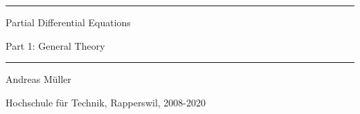\documentclass[a4paper,12pt]{book}
\begin{document}
\pagestyle{fancy}
\lhead{}
\rhead{}
\frontmatter
\newcommand\HRule{\noindent\rule{\linewidth}{1.5pt}}
\begin{titlepage}
\HRule
\vspace*{10pt}
\begin{flushright}
{\Huge
Partial Differential Equations}
\end{flushright}
\begin{flushright}
{\Large Part 1: General Theory}
\end{flushright}
\HRule
\begin{flushright}
\vspace{30pt}
\LARGE
Andreas Müller
\end{flushright}
\begin{center}
Hochschule für Technik, Rapperswil, 2008-2020
\end{center}
\end{titlepage}
\hypersetup{
    colorlinks=true,
    linktoc=all,
    linkcolor=blue
}
\tableofcontents
\newtheorem{satz}{Theorem}[chapter]
\newtheorem{problem}[satz]{Problem}
\newtheorem{hilfssatz}[satz]{Lemma}
\newtheorem{definition}[satz]{Definition}
\newtheorem{annahme}[satz]{Assumption}
\newtheorem{aufgabe}[satz]{Task}
\newenvironment{beispiel}[1][Example]{%
\begin{proof}[#1]%
\renewcommand{\qedsymbol}{$\bigcirc$}
}{\end{proof}}
\allowdisplaybreaks
\mainmatter











\appendix

\vfill
\pagebreak
\ifodd\value{page}\else\null\clearpage\fi
{}
\rhead{}

\end{document}
